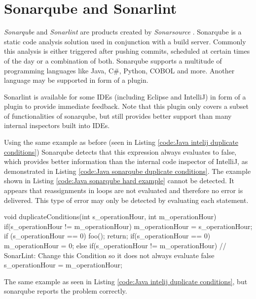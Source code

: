 \section{Sonarqube and Sonarlint} %
\label{sec:sonar}
\emph{Sonarqube} \cite{sonarqube} and \emph{Sonarlint} \cite{SonarLintFixIssues} are products created by \emph{Sonarsource} \cite{CodeQualityCode}. Sonarqube is a static code analysis solution used in conjunction with a build server.
Commonly this analysis is either triggered after pushing commits, scheduled at certain times of the day or a combination of both.
Sonarqube supports a multitude of programming languages like Java, C\#, Python, COBOL and more. Another language may be supported in form of a plugin.


Sonarlint is available for some IDEs (including Eclipse and IntelliJ) in form of a plugin to provide immediate feedback. Note that this plugin only covers a subset of functionalities of sonarqube, but still provides better support than many internal inspectors built into IDEs.

\newpage
Using the same example as before (seen in Listing \ref{code:Java intelij duplicate conditions}) Sonarqube detects that this expression always evaluates to false, which provides better information than the internal code inspector of IntelliJ, as demonstrated in Listing \ref{code:Java sonarqube duplicate conditions}. The example shown in Listing \ref{code:Java sonarqube hard example} cannot be detected. It appears that reassignments in loops are not evaluated and therefore no error is delivered. This type of error may only be detected by evaluating each statement.


\begin{program}[h!]
	\begin{JavaCode}
void duplicateConditions(int s_operationHour, int m_operationHour) {
	if(s_operationHour != m_operationHour) {
		m_operationHour = s_operationHour;
		if (s_operationHour == 0) {
			foo();        
		}
		return;
	}
	if(s_operationHour == 0) {
		m_operationHour = 0;
	} else {
		if(s_operationHour != m_operationHour) { // SonarLint: Change this Condition so it does not always evaluate false
			s_operationHour = m_operationHour;
		}
	}
}\end{JavaCode}
	\caption{The same example as seen in Listing \ref{code:Java intelij duplicate conditions}, but sonarqube reports the problem correctly. }
	\label{code:Java sonarqube duplicate conditions}
\end{program}

